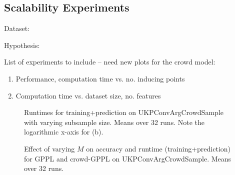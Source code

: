 \subsection{Scalability Experiments}\label{sec:exp_scale}

Dataset:

Hypothesis: 

List of experiments to include -- need new plots for the crowd model:
\begin{enumerate}
\item Performance, computation time vs. no. inducing points
\item Computation time vs. dataset size, no. features
\end{enumerate}

\begin{figure}
\caption{
    Runtimes for training+prediction on UKPConvArgCrowdSample with varying subsample size. Means over 32 runs. 
    Note the logarithmic x-axis for (b).
}
\end{figure}
\begin{figure}
\caption{
Effect of varying $M$ on accuracy and runtime (training+prediction) for GPPL and crowd-GPPL on UKPConvArgCrowdSample. Means over 32 runs.
}
\end{figure}
